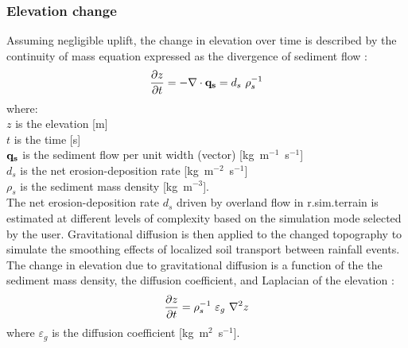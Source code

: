 \documentclass[gmd, manuscript]{copernicus}
\begin{document}
\subsubsection{Elevation change} 
Assuming negligible uplift, the change in elevation over time 
is described by the continuity of mass equation 
expressed as the divergence of sediment flow  \citep{Tucker2001}:
\begin{equation}
\label{eq:evolution} 
{\partial z \over \partial t } = -\nabla \cdot {\bf q_s} = d_s ~ \rho_s^{-1} 
\end{equation}
{\small
where: \\
\noindent
\hspace*{0.5em} $z$ is the elevation [\unit{m}] \\
\hspace*{0.5em} $t$ is the time [\unit{s}] \\
\hspace*{0.5em} ${\bf q_s}$ is the sediment flow per unit width (vector) [\unit{kg~m}$^{-1}$~\unit{s}$^{-1}$]\\
\hspace*{0.5em} $d_s$ is the net erosion-deposition rate [\unit{kg~m}$^{-2}$~\unit{s}$^{-1}$]\\
\hspace*{0.5em} $\rho_s$ is the sediment mass density [\unit{kg~m}$^{-3}$].\\
}
The net erosion-deposition rate $d_s$ driven by overland flow
in r.sim.terrain is estimated at different levels of complexity based 
on the simulation mode selected by the user.
Gravitational diffusion is then applied to the changed topography 
to simulate the smoothing effects 
of localized soil transport between rainfall events.
The change in elevation due to gravitational diffusion
is a function of the the sediment mass density,
the diffusion coefficient, and Laplacian of the elevation
\citep{Thaxton2004}:
\begin{equation}
\label{eq:grav_diffusion} 
{\partial z \over \partial t } = \rho_s^{-1} ~ \varepsilon_g ~ \nabla^2 z 
\end{equation}
\noindent
where $\varepsilon_g$ is the diffusion coefficient [\unit{kg~m}$^{2}$~\unit{s}$^{-1}$].
\end{document}

